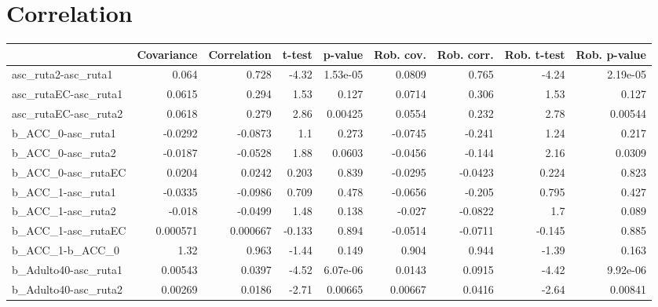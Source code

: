 \section{Correlation}
\begin{tabular}{lrrrrrrrr}
\toprule
{} &  Covariance &  Correlation &   t-test &  p-value &  Rob. cov. &  Rob. corr. &  Rob. t-test &  Rob. p-value \\
\midrule
asc\_ruta2-asc\_ruta1        &       0.064 &        0.728 &    -4.32 & 1.53e-05 &     0.0809 &       0.765 &        -4.24 &      2.19e-05 \\
asc\_rutaEC-asc\_ruta1       &      0.0615 &        0.294 &     1.53 &    0.127 &     0.0714 &       0.306 &         1.53 &         0.127 \\
asc\_rutaEC-asc\_ruta2       &      0.0618 &        0.279 &     2.86 &  0.00425 &     0.0554 &       0.232 &         2.78 &       0.00544 \\
b\_ACC\_0-asc\_ruta1          &     -0.0292 &      -0.0873 &      1.1 &    0.273 &    -0.0745 &      -0.241 &         1.24 &         0.217 \\
b\_ACC\_0-asc\_ruta2          &     -0.0187 &      -0.0528 &     1.88 &   0.0603 &    -0.0456 &      -0.144 &         2.16 &        0.0309 \\
b\_ACC\_0-asc\_rutaEC         &      0.0204 &       0.0242 &    0.203 &    0.839 &    -0.0295 &     -0.0423 &        0.224 &         0.823 \\
b\_ACC\_1-asc\_ruta1          &     -0.0335 &      -0.0986 &    0.709 &    0.478 &    -0.0656 &      -0.205 &        0.795 &         0.427 \\
b\_ACC\_1-asc\_ruta2          &      -0.018 &      -0.0499 &     1.48 &    0.138 &     -0.027 &     -0.0822 &          1.7 &         0.089 \\
b\_ACC\_1-asc\_rutaEC         &    0.000571 &     0.000667 &   -0.133 &    0.894 &    -0.0514 &     -0.0711 &       -0.145 &         0.885 \\
b\_ACC\_1-b\_ACC\_0            &        1.32 &        0.963 &    -1.44 &    0.149 &      0.904 &       0.944 &        -1.39 &         0.163 \\
b\_Adulto40-asc\_ruta1       &     0.00543 &       0.0397 &    -4.52 & 6.07e-06 &     0.0143 &      0.0915 &        -4.42 &      9.92e-06 \\
b\_Adulto40-asc\_ruta2       &     0.00269 &       0.0186 &    -2.71 &  0.00665 &    0.00667 &      0.0416 &        -2.64 &       0.00841 \\

\end{tabular}
